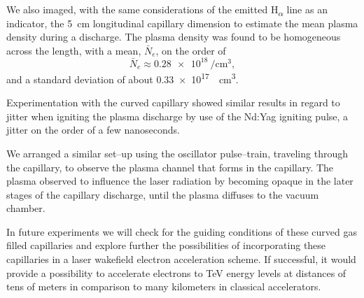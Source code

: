 \documentclass[../main.tex]{subfiles}
\begin{document}
We also imaged, with the same considerations of the emitted H\textsubscript{$\alpha$} line as an indicator, the \SI{5}{\cm} longitudinal capillary dimension to estimate the mean plasma density during a discharge. The plasma density was found to be homogeneous across the length, with a mean, $\bar{N}_e$, on the order of
\begin{equation*}
    \bar{N}_e \approx \SI{0.28e18}{\per\cubic\cm},
\end{equation*}
and a standard deviation of about \SI{0.33e17}{\per\cubic\cm}.

Experimentation with the curved capillary showed similar results in regard to jitter when igniting the plasma discharge by use of the Nd:Yag igniting pulse, a jitter on the order of a few nanoseconds.

We arranged a similar set--up using the oscillator pulse--train, traveling through the capillary, to observe the plasma channel that forms in the capillary. The plasma observed to influence the laser radiation by becoming opaque in the later stages of the capillary discharge, until the plasma diffuses to the vacuum chamber.

In future experiments we will check for the guiding conditions of these curved gas filled capillaries and explore further the possibilities of incorporating these capillaries in a laser wakefield electron acceleration scheme. If successful, it would provide a possibility to accelerate electrons to \si{\tera\eV} energy levels at distances of tens of meters in comparison to many kilometers in classical accelerators.
\end{document}
